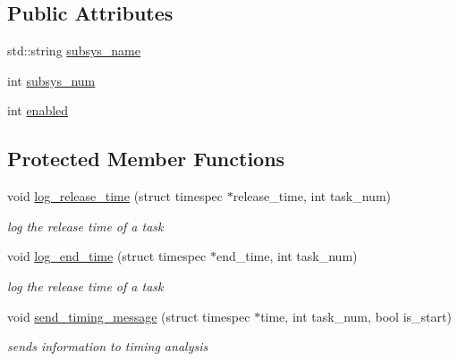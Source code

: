 \subsection*{Public Attributes}
\begin{DoxyCompactItemize}
\item 
std\-::string \hyperlink{classSubsystem_a731ef7c72752c9fafba06225a21e77ba}{subsys\-\_\-name}
\item 
int \hyperlink{classSubsystem_af5095f64990120d1ff8e1e07c7c1ee77}{subsys\-\_\-num}
\item 
int \hyperlink{classSubsystem_a3c1751f0ac60254618dc22f1b75fbfda}{enabled}
\end{DoxyCompactItemize}
\subsection*{Protected Member Functions}
\begin{DoxyCompactItemize}
\item 
void \hyperlink{classSubsystem_aaa5c98618b06473ac3e88ad658f804ec}{log\-\_\-release\-\_\-time} (struct timespec $\ast$release\-\_\-time, int task\-\_\-num)
\begin{DoxyCompactList}\small\item\em log the release time of a task \end{DoxyCompactList}\item 
void \hyperlink{classSubsystem_ac3e8ba69ef5cf814f19b6a5ee25473ca}{log\-\_\-end\-\_\-time} (struct timespec $\ast$end\-\_\-time, int task\-\_\-num)
\begin{DoxyCompactList}\small\item\em log the release time of a task \end{DoxyCompactList}\item 
void \hyperlink{classSubsystem_a2cd6f9f05fecd33d8d362cd5c28f4e71}{send\-\_\-timing\-\_\-message} (struct timespec $\ast$time, int task\-\_\-num, bool is\-\_\-start)
\begin{DoxyCompactList}\small\item\em sends information to timing analysis \end{DoxyCompactList}\end{DoxyCompactItemize}
